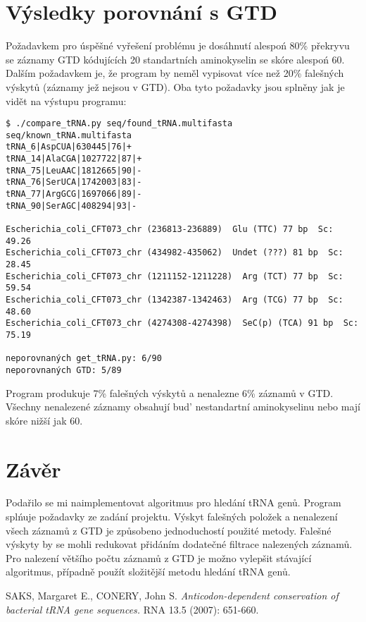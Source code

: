 \documentclass[12pt]{article}
\begin{document}
\section{Výsledky porovnání s GTD}
Požadavkem pro úspěšné vyřešení problému je dosáhnutí alespoń 80\% překryvu se záznamy GTD kódujících 20 standartních aminokyselin se skóre alespoń 60. Dalším požadavkem je, že program by neměl vypisovat více než 20\% falešných výskytů (záznamy jež nejsou v GTD). Oba tyto požadavky jsou splněny jak je vidět na výstupu programu:

\begin{verbatim}
$ ./compare_tRNA.py seq/found_tRNA.multifasta seq/known_tRNA.multifasta
tRNA_6|AspCUA|630445|76|+
tRNA_14|AlaCGA|1027722|87|+
tRNA_75|LeuAAC|1812665|90|-
tRNA_76|SerUCA|1742003|83|-
tRNA_77|ArgGCG|1697066|89|-
tRNA_90|SerAGC|408294|93|-

Escherichia_coli_CFT073_chr (236813-236889)  Glu (TTC) 77 bp  Sc: 49.26
Escherichia_coli_CFT073_chr (434982-435062)  Undet (???) 81 bp  Sc: 28.45
Escherichia_coli_CFT073_chr (1211152-1211228)  Arg (TCT) 77 bp  Sc: 59.54
Escherichia_coli_CFT073_chr (1342387-1342463)  Arg (TCG) 77 bp  Sc: 48.60
Escherichia_coli_CFT073_chr (4274308-4274398)  SeC(p) (TCA) 91 bp  Sc: 75.19

neporovnaných get_tRNA.py: 6/90
neporovnaných GTD: 5/89
\end{verbatim}

Program produkuje 7\% falešných výskytů a nenalezne 6\% záznamů v GTD. Všechny nenalezené záznamy obsahují bud' nestandartní aminokyselinu nebo mají skóre nižší jak 60. 

\section{Závěr}
Podařilo se mi naimplementovat algoritmus pro hledání tRNA genů. Program splńuje požadavky ze zadání projektu. Výskyt falešných položek a nenalezení všech záznamů z GTD je způsobeno jednoduchostí použité metody. Falešné výskyty by se mohli redukovat přidáním dodatečné filtrace nalezených záznamů. Pro nalezení většího počtu záznamů z GTD je možno vylepšit stávající algoritmus, případně použít složitější metodu hledání tRNA genů.

\begin{thebibliography}{99}

  SAKS, Margaret E., CONERY, John S.
  \emph{Anticodon-dependent conservation of bacterial tRNA gene sequences.}
  RNA 13.5 (2007): 651-660.

\end{thebibliography}
\end{document}
